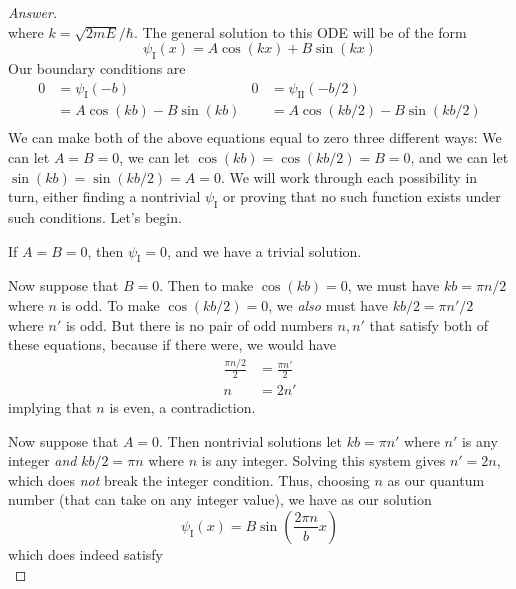 \documentclass[../psets.tex]{subfiles}
\begin{document}
\begin{enumerate}
\begin{enumerate}
\begin{proof}[Answer]
\begin{equation*}
            \end{equation*}
            where $k=\sqrt{2mE}/\hbar$. The general solution to this ODE will be of the form
            \begin{equation*}
                \psi_\text{I}(x) = A\cos(kx)+B\sin(kx)
            \end{equation*}
            Our boundary conditions are
            \begin{align*}
                0 &= \psi_\text{I}(-b)&
                    0 &= \psi_\text{II}(-b/2)\\
                &= A\cos(kb)-B\sin(kb)&
                    &= A\cos(kb/2)-B\sin(kb/2)\\
            \end{align*}
            We can make both of the above equations equal to zero three different ways: We can let $A=B=0$, we can let $\cos(kb)=\cos(kb/2)=B=0$, and we can let $\sin(kb)=\sin(kb/2)=A=0$. We will work through each possibility in turn, either finding a nontrivial $\psi_\text{I}$ or proving that no such function exists under such conditions. Let's begin.\par
            If $A=B=0$, then $\psi_\text{I}=0$, and we have a trivial solution.\par
            Now suppose that $B=0$. Then to make $\cos(kb)=0$, we must have $kb=\pi n/2$ where $n$ is odd. To make $\cos(kb/2)=0$, we \emph{also} must have $kb/2=\pi n'/2$ where $n'$ is odd. But there is no pair of odd numbers $n,n'$ that satisfy both of these equations, because if there were, we would have
            \begin{align*}
                \frac{\pi n/2}{2} &= \frac{\pi n'}{2}\\
                n &= 2n'
            \end{align*}
            implying that $n$ is even, a contradiction.\par
            Now suppose that $A=0$. Then nontrivial solutions let $kb=\pi n'$ where $n'$ is any integer \emph{and} $kb/2=\pi n$ where $n$ is any integer. Solving this system gives $n'=2n$, which does \emph{not} break the integer condition. Thus, choosing $n$ as our quantum number (that can take on any integer value), we have as our solution
            \begin{equation*}
                \psi_\text{I}(x) = B\sin\left( \frac{2\pi n}{b}x \right)
            \end{equation*}
            which does indeed satisfy
            \begin{equation*}

\end{equation*}
\end{proof}
\end{enumerate}
\end{enumerate}
\end{document}
